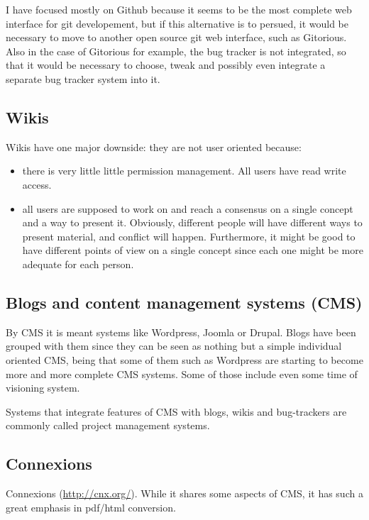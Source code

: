 \documentclass[12pt]{article}
\begin{document}
I have focused mostly on Github because it seems to be the most complete web interface for git developement, but if this alternative is to persued, it would be necessary to move to another open source git web interface, such as Gitorious. Also in the case of Gitorious for example, the bug tracker is not integrated, so that it would be necessary to choose, tweak and possibly even integrate a separate bug tracker system into it.

\subsection{Wikis}

Wikis have one major downside: they are not user oriented because:

\begin{itemize}
  \item there is very little little permission management. All users have read write access.
  \item all users are supposed to work on and reach a consensus on a single concept and a way to present it. Obviously, different people will have different ways to present material, and conflict will happen. Furthermore, it might be good to have different points of view on a single concept since each one might be more adequate for each person.
\end{itemize}

\subsection{Blogs and content management systems (CMS)}

By CMS it is meant systems like Wordpress, Joomla or Drupal. Blogs have been grouped with them since they can be seen as nothing but a simple individual oriented CMS, being that some of them such as Wordpress are starting to become more and more complete CMS systems. Some of those include even some time of visioning system.

Systems that integrate features of CMS with blogs, wikis and bug-trackers are commonly called project management systems.

\subsection{Connexions}

Connexions (\url{http://cnx.org/}). While it shares some aspects of CMS, it has such a great emphasis in pdf/html conversion.
\end{document}
